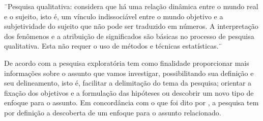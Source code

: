 \begin{fullcite}
    ¨Pesquisa qualitativa: considera que há uma relação dinâmica entre o mundo
real e o sujeito, isto é, um vínculo indissociável entre o mundo objetivo
e a subjetividade do sujeito que não pode ser traduzido em números. A
interpretação dos fenômenos e a atribuição de significados são básicas
no processo de pesquisa qualitativa. Esta não requer o uso de métodos
e técnicas estatísticas.¨\cite[p.~70]{prodanov2013}   
\end{fullcite}

De acordo com \textcite{prodanov2013} a pesquisa exploratória tem como finalidade proporcionar mais informações sobre o assunto que vamos investigar, possibilitando sua definição e seu delineamento, isto é, facilitar a delimitação do tema da pesquisa; orientar a fixação dos objetivos e a formulação das hipóteses ou descobrir um novo tipo de enfoque para o assunto. Em concordância com o que foi dito por \textcite{prodanov2013}, a pesquisa tem por definição a descoberta de um enfoque para o assunto relacionado.

